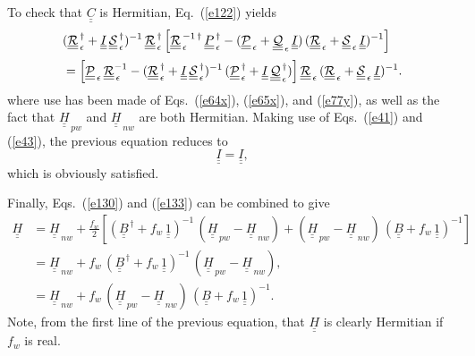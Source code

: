 \documentclass[12pt,prb,aps,notitlepage]{revtex4-1}
\begin{document}
To check that $\underline{\underline{C}} $ is Hermitian, Eq.~(\ref{e122}) yields
\begin{align}
&(\underline{\underline{\cal R}}_{\,\epsilon}^{\,\dag}+\underline{\underline{I}}\,\underline{\underline{\cal S}}_{\,\epsilon}^{\,\dag})^{-1}\,\underline{\underline{\cal R}}_{\,\epsilon}^{\,\dag}
\left[\underline{\underline{\cal R}}_{\,\epsilon}^{\,-1\,\dag}\,\underline{\underline{P}}_{\,\epsilon}^{\,\dag}-(\underline{\underline{\cal P}}_{\,\epsilon}+\underline{\underline{\cal Q}}_{\,\epsilon}\,\underline{\underline{I}})\,(\underline{\underline{\cal R}}_{\,\epsilon}+\underline{\underline{\cal S}}_{\,\epsilon}\,\underline{\underline{I}})^{-1}
 \right]\nonumber\\[0.5ex]
 &=
  \left[\underline{\underline{\cal P}}_{\,\epsilon}\,\underline{\underline{\cal R}}_{\,\epsilon}^{-1}-(\underline{\underline{\cal R}}_{\,\epsilon}^{\,\dag}+
 \underline{\underline{I}}\,\underline{\underline{\cal S}}_{\,\epsilon}^{\,\dag})^{-1}\,(\underline{\underline{\cal P}}_{\,\epsilon}^{\,\dag}
 +\underline{\underline{I}}\,\underline{\underline{\cal Q}}_{\,\epsilon}^{\,\dag})
 \right]\underline{\underline{\cal R}}_{\,\epsilon}\,(\underline{\underline{\cal R}}_{\,\epsilon} + \underline{\underline{\cal S}}_{\,\epsilon}\,\underline{\underline{I}})^{-1}.
\end{align}
where use has been made of Eqs.~(\ref{e64x}), (\ref{e65x}), and (\ref{e77y}), as well as the fact that $\underline{\underline{H}}_{\,pw}$ and $\underline{\underline{H}}_{\,nw}$ are both Hermitian. 
Making use of Eqs.~(\ref{e41}) and (\ref{e43}), the previous equation reduces to 
\begin{equation}
\underline{\underline{I}}= \underline{\underline{I}},
\end{equation}
which is obviously satisfied. 

Finally, Eqs.~(\ref{e130}) and (\ref{e133}) can
be combined to give
\begin{align}\label{e128x}
\underline{\underline{H}} &= \underline{\underline{H}}_{\,nw} 
+\frac{ f_w}{2}\left[ 
(\underline{\underline{B}}^{\,\dag}+f_w\,\underline{\underline{1}})^{-1}\,( \underline{\underline{H}}_{\,pw} - \underline{\underline{H}}_{\,nw} )
+(\underline{\underline{H}}_{\,pw} - \underline{\underline{H}}_{\,nw} )\,(\underline{\underline{B}}+f_w\,\underline{\underline{1}})^{-1} \right]\nonumber\\[0.5ex]
&= \underline{\underline{H}}_{\,nw} +f_w\,(\underline{\underline{B}}^{\,\dag}+f_w\,\underline{\underline{1}})^{-1}\,( \underline{\underline{H}}_{\,pw} - \underline{\underline{H}}_{\,nw} ),\nonumber\\[0.5ex]
&= \underline{\underline{H}}_{\,nw} +f_w\,(\underline{\underline{H}}_{\,pw} - \underline{\underline{H}}_{\,nw} )\,(\underline{\underline{B}}+f_w\,\underline{\underline{1}})^{-1}.
\end{align}
Note, from the first line of the previous equation,  that $\underline{\underline{H}}$ is clearly Hermitian if $f_w$ is real. 
\end{document}
